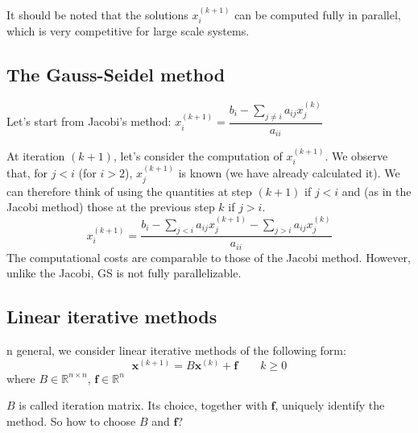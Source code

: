 It should be noted that the solutions $x_{i}^{(k+1)}$ can be computed fully in parallel, which is very competitive for large scale systems.

\subsection{The Gauss-Seidel method}

Let's start from Jacobi's method: $x_{i}^{(k+1)} = \dfrac{b_{i} - \sum_{j \neq i} a_{ij} x_{j}^{(k)}}{a_{ii}}$

At iteration $(k + 1)$, let's consider the computation of $x_{i}^{(k+1)}$. We observe that, for $j < i$ (for $i > 2$), $x_{j}^{(k + 1)}$ is known (we have already calculated it). We can therefore think of using the quantities at step $(k + 1)$ if $j < i$ and (as in the Jacobi method) those at the previous step $k$ if $j > i$.
$$
    x_{i}^{(k+1)} = \frac{b_{i} - \sum_{j<i}a_{i j} x_{j}^{(k+1)} - \sum_{j > i}a_{ij} x_{j}^{(k)}}{a_{ii}}
$$
The computational costs are comparable to those of the Jacobi method. However, unlike the Jacobi, GS is not fully parallelizable.

\subsection{Linear iterative methods}

n general, we consider linear iterative methods of the following form:
$$
    \mathbf{x}^{(k + 1)} = B \mathbf{x}^{(k)} + \mathbf{f} \qquad k \geq 0
$$
where $B \in \mathbb{R}^{n \times n}$, $\mathbf{f} \in \mathbb{R}^{n}$

$B$ is called iteration matrix. Its choice, together with $\mathbf{f}$, uniquely identify the method. So how to choose $B$ and $\mathbf{f}$?

